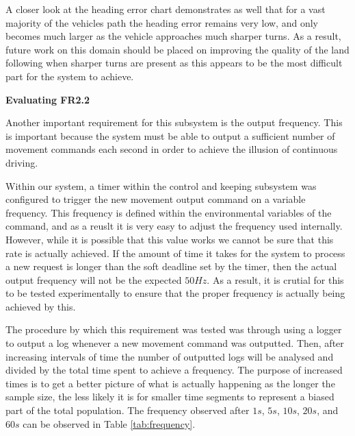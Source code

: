 \documentclass[titlepage,draft]{article}
\begin{document}
{A closer look at the heading error chart demonstrates as well that for a vast majority of the vehicles path the heading error remains very low, and only becomes much larger as the vehicle approaches much sharper turns. As a result, future work on this domain should be placed on improving the quality of the land following when sharper turns are present as this appears to be the most difficult part for the system to achieve.


\textbf{Evaluating FR2.2}

Another important requirement for this subsystem is the output frequency. This is important because the system must be able to output a sufficient number of movement commands each second in order to achieve the illusion of continuous driving.

Within our system, a timer within the control and keeping subsystem was configured to trigger the new movement output command on a variable frequency. This frequency is defined within the environmental variables of the command, and as a reuslt it is very easy to adjust the frequency used internally. However, while it is possible that this value works we cannot be sure that this rate is actually achieved. If the amount of time it takes for the system to process a new request is longer than the soft deadline set by the timer, then the actual output frequency will not be the expected \(50Hz\). As a result, it is crutial for this to be tested experimentally to ensure that the proper frequency is actually being achieved by this.

The procedure by which this requirement was tested was through using a logger to output a log whenever a new movement command was outputted. Then, after increasing intervals of time the number of outputted logs will be analysed and divided by the total time spent to achieve a frequency. The purpose of increased times is to get a better picture of what is actually happening as the longer the sample size, the less likely it is for smaller time segments to represent a biased part of the total population. The frequency observed after \(1s\), \(5s\), \(10s\), \(20s\), and \(60s\) can be observed in Table \ref{tab:frequency}.

}
\end{document}
